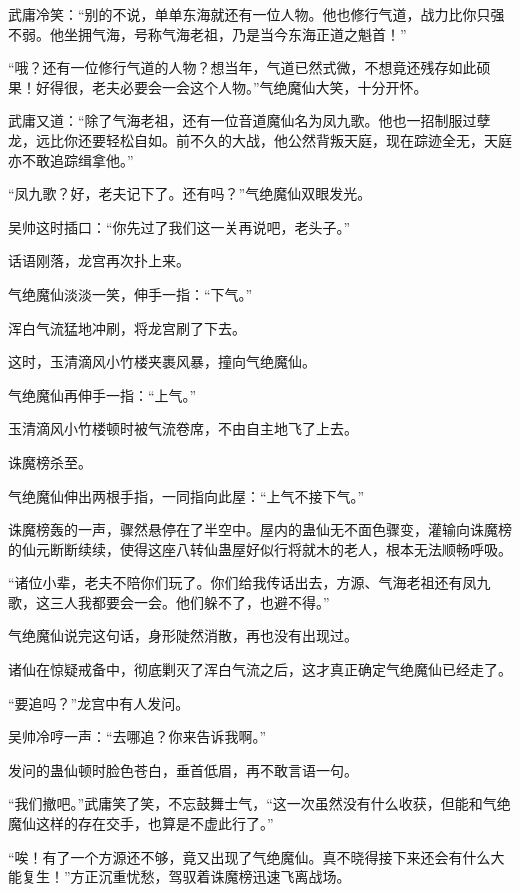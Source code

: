 \begin{this_body}
武庸冷笑：“别的不说，单单东海就还有一位人物。他也修行气道，战力比你只强不弱。他坐拥气海，号称气海老祖，乃是当今东海正道之魁首！”

“哦？还有一位修行气道的人物？想当年，气道已然式微，不想竟还残存如此硕果！好得很，老夫必要会一会这个人物。”气绝魔仙大笑，十分开怀。

武庸又道：“除了气海老祖，还有一位音道魔仙名为凤九歌。他也一招制服过孽龙，远比你还要轻松自如。前不久的大战，他公然背叛天庭，现在踪迹全无，天庭亦不敢追踪缉拿他。”

“凤九歌？好，老夫记下了。还有吗？”气绝魔仙双眼发光。

吴帅这时插口：“你先过了我们这一关再说吧，老头子。”

话语刚落，龙宫再次扑上来。

气绝魔仙淡淡一笑，伸手一指：“下气。”

浑白气流猛地冲刷，将龙宫刷了下去。

这时，玉清滴风小竹楼夹裹风暴，撞向气绝魔仙。

气绝魔仙再伸手一指：“上气。”

玉清滴风小竹楼顿时被气流卷席，不由自主地飞了上去。

诛魔榜杀至。

气绝魔仙伸出两根手指，一同指向此屋：“上气不接下气。”

诛魔榜轰的一声，骤然悬停在了半空中。屋内的蛊仙无不面色骤变，灌输向诛魔榜的仙元断断续续，使得这座八转仙蛊屋好似行将就木的老人，根本无法顺畅呼吸。

“诸位小辈，老夫不陪你们玩了。你们给我传话出去，方源、气海老祖还有凤九歌，这三人我都要会一会。他们躲不了，也避不得。”

气绝魔仙说完这句话，身形陡然消散，再也没有出现过。

诸仙在惊疑戒备中，彻底剿灭了浑白气流之后，这才真正确定气绝魔仙已经走了。

“要追吗？”龙宫中有人发问。

吴帅冷哼一声：“去哪追？你来告诉我啊。”

发问的蛊仙顿时脸色苍白，垂首低眉，再不敢言语一句。

“我们撤吧。”武庸笑了笑，不忘鼓舞士气，“这一次虽然没有什么收获，但能和气绝魔仙这样的存在交手，也算是不虚此行了。”

“唉！有了一个方源还不够，竟又出现了气绝魔仙。真不晓得接下来还会有什么大能复生！”方正沉重忧愁，驾驭着诛魔榜迅速飞离战场。

\end{this_body}

